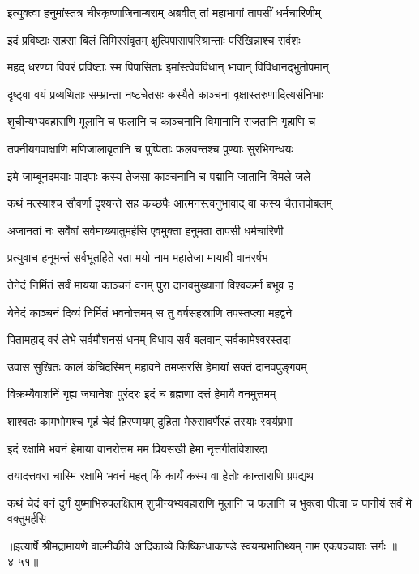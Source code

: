 
\twolineshloka
{इत्युक्त्वा हनुमांस्तत्र चीरकृष्णाजिनाम्बराम्}
{अब्रवीत् तां महाभागां तापसीं धर्मचारिणीम्} %

\twolineshloka
{इदं प्रविष्टाः सहसा बिलं तिमिरसंवृतम्}
{क्षुत्पिपासापरिश्रान्ताः परिखिन्नाश्च सर्वशः} %

\twolineshloka
{महद् धरण्या विवरं प्रविष्टाः स्म पिपासिताः}
{इमांस्त्वेवंविधान् भावान् विविधानद्भुतोपमान्} %

\twolineshloka
{दृष्ट्वा वयं प्रव्यथिताः सम्भ्रान्ता नष्टचेतसः}
{कस्यैते काञ्चना वृक्षास्तरुणादित्यसंनिभाः} %

\twolineshloka
{शुचीन्यभ्यवहाराणि मूलानि च फलानि च}
{काञ्चनानि विमानानि राजतानि गृहाणि च} %

\twolineshloka
{तपनीयगवाक्षाणि मणिजालावृतानि च}
{पुष्पिताः फलवन्तश्च पुण्याः सुरभिगन्धयः} %

\twolineshloka
{इमे जाम्बूनदमयाः पादपाः कस्य तेजसा}
{काञ्चनानि च पद्मानि जातानि विमले जले} %

\twolineshloka
{कथं मत्स्याश्च सौवर्णा दृश्यन्ते सह कच्छपैः}
{आत्मनस्त्वनुभावाद् वा कस्य चैतत्तपोबलम्} %

\twolineshloka
{अजानतां नः सर्वेषां सर्वमाख्यातुमर्हसि}
{एवमुक्ता हनुमता तापसी धर्मचारिणी} %

\twolineshloka
{प्रत्युवाच हनूमन्तं सर्वभूतहिते रता}
{मयो नाम महातेजा मायावी वानरर्षभ} %

\twolineshloka
{तेनेदं निर्मितं सर्वं मायया काञ्चनं वनम्}
{पुरा दानवमुख्यानां विश्वकर्मा बभूव ह} %

\twolineshloka
{येनेदं काञ्चनं दिव्यं निर्मितं भवनोत्तमम्}
{स तु वर्षसहस्राणि तपस्तप्त्वा महद्वने} %

\twolineshloka
{पितामहाद् वरं लेभे सर्वमौशनसं धनम्}
{विधाय सर्वं बलवान् सर्वकामेश्वरस्तदा} %

\twolineshloka
{उवास सुखितः कालं कंचिदस्मिन् महावने}
{तमप्सरसि हेमायां सक्तं दानवपुङ्गवम्} %

\twolineshloka
{विक्रम्यैवाशनिं गृह्य जघानेशः पुरंदरः}
{इदं च ब्रह्मणा दत्तं हेमायै वनमुत्तमम्} %

\twolineshloka
{शाश्वतः कामभोगश्च गृहं चेदं हिरण्मयम्}
{दुहिता मेरुसावर्णेरहं तस्याः स्वयंप्रभा} %

\twolineshloka
{इदं रक्षामि भवनं हेमाया वानरोत्तम}
{मम प्रियसखी हेमा नृत्तगीतविशारदा} %

\twolineshloka
{तयादत्तवरा चास्मि रक्षामि भवनं महत्}
{किं कार्यं कस्य वा हेतोः कान्ताराणि प्रपद्यथ} %

\threelineshloka
{कथं चेदं वनं दुर्गं युष्माभिरुपलक्षितम्}
{शुचीन्यभ्यवहाराणि मूलानि च फलानि च}
{भुक्त्वा पीत्वा च पानीयं सर्वं मे वक्तुमर्हसि} %


॥इत्यार्षे श्रीमद्रामायणे वाल्मीकीये आदिकाव्ये किष्किन्धाकाण्डे स्वयम्प्रभातिथ्यम् नाम एकपञ्चाशः सर्गः ॥४-५१॥
